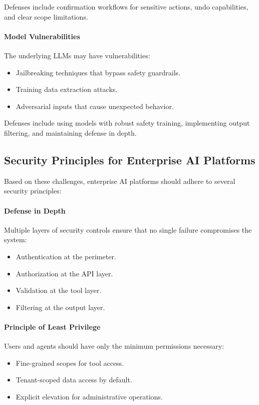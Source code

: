 \documentclass[a4paper,twoside]{sapthesis}
\begin{document}
Defenses include confirmation workflows for sensitive actions, undo capabilities, and clear scope limitations.

\paragraph{Model Vulnerabilities}

The underlying LLMs may have vulnerabilities:

\begin{itemize}
    \item Jailbreaking techniques that bypass safety guardrails.
    \item Training data extraction attacks.
    \item Adversarial inputs that cause unexpected behavior.
\end{itemize}

Defenses include using models with robust safety training, implementing output filtering, and maintaining defense in depth.

\subsection{Security Principles for Enterprise AI Platforms}

Based on these challenges, enterprise AI platforms should adhere to several security principles:

\paragraph{Defense in Depth}

Multiple layers of security controls ensure that no single failure compromises the system:
\begin{itemize}
    \item Authentication at the perimeter.
    \item Authorization at the API layer.
    \item Validation at the tool layer.
    \item Filtering at the output layer.
\end{itemize}

\paragraph{Principle of Least Privilege}

Users and agents should have only the minimum permissions necessary:
\begin{itemize}
    \item Fine-grained scopes for tool access.
    \item Tenant-scoped data access by default.
    \item Explicit elevation for administrative operations.
\end{itemize}
\end{document}
